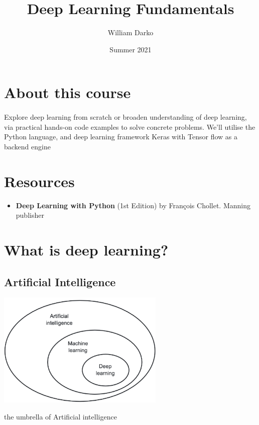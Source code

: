 \documentclass[12pt, a4paper]{article}
\title{Deep Learning Fundamentals}
\author{William Darko}
\date{Summer 2021}
\begin{document}
\maketitle
\newpage

\tableofcontents

\newpage

\section{About this course}
\paragraph*{}
Explore deep learning from scratch or broaden understanding of deep learning, via
practical hands-on code examples to solve concrete problems. We'll
utilise the Python language, and deep learning framework Keras with Tensor flow as a backend engine



\newpage

\section{Resources}

\begin{itemize}
   \item \textbf{Deep Learning with Python} (1st Edition) by François Chollet.
   Manning publisher
\end{itemize}

\newpage

\section{What is deep learning?}

\subsection{Artificial Intelligence}
{
   \centering
   \includegraphics[width=8cm]{AI_Umbrella.png}

   the umbrella of Artificial intelligence

}
\end{document}
